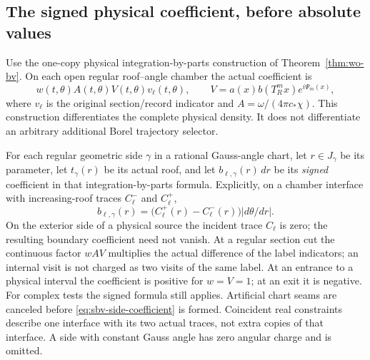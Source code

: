 \subsection{The signed physical coefficient, before absolute values}

Use the one-copy physical integration-by-parts construction of
Theorem~\ref{thm:wo-bv}.  On each open regular roof--angle chamber
the actual coefficient is
\[
       w(t,\theta) A(t,\theta) V(t,\theta)v_\ell(t,\theta),
 \qquad V=a(x)b(T_R^m x)e^{i\Psi_m(x)},
\]
where $v_\ell$ is the original section/record indicator and
$A=\omega/(4\pi c_*\chi)$.  This construction differentiates the
complete physical density.  It does not differentiate an arbitrary
additional Borel trajectory selector.

For each regular geometric side $\gamma$ in a rational Gauss-angle
chart, let $r\in J_\gamma$ be its parameter, let
$t_\gamma(r)$ be its actual roof, and let
$b_{\ell,\gamma}(r)\,dr$ be its \emph{signed} coefficient in that
integration-by-parts formula.  Explicitly, on a chamber interface
with increasing-roof traces $C_\ell^-$ and $C_\ell^+$,
\begin{equation}\label{eq:sbv-side-coefficient}
 b_{\ell,\gamma}(r)
   =\bigl(C_\ell^+(r)-C_\ell^-(r)\bigr)
                           |d\theta/dr|.
\end{equation}
On the exterior side of a physical source the incident trace
$C_\ell$ is zero; the resulting boundary coefficient need not vanish.
At a regular section cut the continuous factor $wAV$ multiplies
the actual difference of the label indicators; an internal visit
is not charged as two visits of the same label.  At an entrance to
a physical interval the coefficient is positive for $w=V=1$;
at an exit it is negative.  For complex tests the signed formula
still applies.  Artificial chart seams are canceled before
\eqref{eq:sbv-side-coefficient} is formed.  Coincident real
constraints describe one interface with its two actual traces,
not extra copies of that interface.  A side with constant Gauss
angle has zero angular charge and is omitted.

